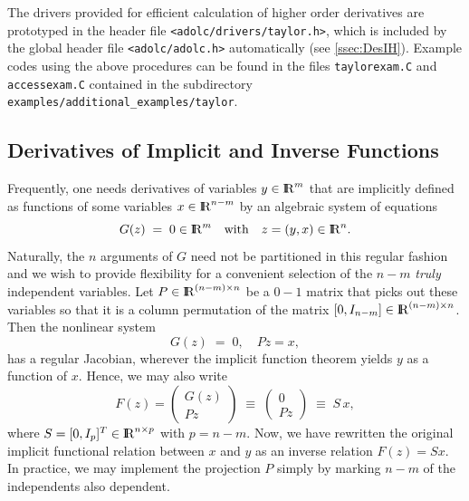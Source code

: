 \documentclass[11pt,twoside]{article}
\newcommand{\R}{{ {\rm I} \kern -.225em {\rm R} }}
\begin{document}
The drivers provided for efficient calculation of higher order
derivatives are prototyped in the header file \verb=<adolc/drivers/taylor.h>=,
which is included by the global header file \verb=<adolc/adolc.h>= automatically
(see \autoref{ssec:DesIH}).
Example codes using the above procedures can be found in the files
\verb=taylorexam.C= and \verb=accessexam.C= contained in the subdirectory
\verb=examples/additional_examples/taylor=.
%
\subsection{Derivatives of Implicit and Inverse Functions}
\label{implicitInverse}
%
Frequently, one needs derivatives of variables
$y \in \R^{m}$ that are implicitly defined as
functions of some variables $x \in \R^{n-m}$
by an algebraic system of equations
\[
G(z) \; = \; 0 \in \R^m \quad
{\rm with} \quad z = (y, x) \in \R^n .
\] 
Naturally, the $n$ arguments of $G$ need not be partitioned in
this regular fashion and we wish to provide flexibility for a
convenient selection of the $n-m$ {\em truly} independent
variables. Let $P \in \R^{(n-m)\times n}$ be a $0-1$ matrix
that picks out these variables so that it is a column
permutation of the matrix $[0,I_{n-m}] \in \R^{(n-m)\times n}$.
Then the nonlinear system
\[
  G(z) \; = \; 0, \quad P z =  x,                           
\] 
has a regular Jacobian, wherever the implicit function theorem
yields $y$ as a function of $x$. Hence, we may also write
\begin{equation}
\label{eq:inv_tensor}
F(z) = \left(\begin{array}{c}
                        G(z) \\
                        P z
                      \end{array} \right)\; \equiv \;
                \left(\begin{array}{c}
                        0 \\
                        P z
                      \end{array} \right)\; \equiv \; S\, x,
\end{equation}
where $S = [0,I_p]^{T} \in \R^{n \times p}$ with $p=n-m$. Now, we have rewritten
the original implicit functional relation between $x$ and $y$ as an inverse
relation $F(z) = Sx$. In practice, we may implement the projection $P$ simply
by marking $n-m$ of the independents also dependent.  
\end{document}

